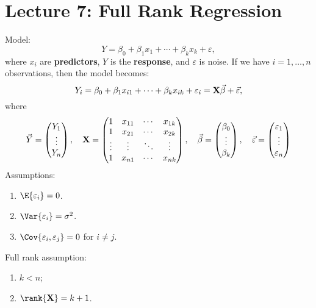\section{Lecture 7: Full Rank Regression}
Model:
\[ Y=\beta_0+\beta_1x_1+\cdots+\beta_k x_k+\varepsilon, \]
where $ x_i $ are \textbf{predictors}, $ Y $ is the \textbf{response},
and $ \varepsilon $ is noise. If we have $ i=1,\ldots,n $ observations, then the model becomes:
\[ Y_i=\beta_0+\beta_1x_{i1}+\cdots+\beta_k x_{ik}+\varepsilon_i=\mathbf{X}\vec{\beta}+\vec{\varepsilon}, \]
where
\[ \vec{Y}=\begin{pmatrix}
        Y_1    \\
        \vdots \\
        Y_n
    \end{pmatrix},\quad
    \mathbf{X}=\begin{pmatrix}
        1      & x_{11} & \cdots & x_{1k} \\
        1      & x_{21} & \cdots & x_{2k} \\
        \vdots & \vdots & \ddots & \vdots \\
        1      & x_{n1} & \cdots & x_{nk}
    \end{pmatrix},\quad
    \vec{\beta}=\begin{pmatrix}
        \beta_0 \\
        \vdots  \\
        \beta_k
    \end{pmatrix},\quad
    \vec{\varepsilon}=
    \begin{pmatrix}
        \varepsilon_1 \\
        \vdots        \\
        \varepsilon_n
    \end{pmatrix} \]
Assumptions:
\begin{enumerate}[(1)]
    \item $ \E{\varepsilon_i}=0 $.
    \item $ \Var{\varepsilon_i}=\sigma^2 $.
    \item $ \Cov{\varepsilon_i,\varepsilon_j}=0 $ for $ i\ne j $.
\end{enumerate}
Full rank assumption:
\begin{enumerate}[(1)]
    \item $ k<n $;
    \item $ \rank{\Matrix{X}}=k+1 $.
\end{enumerate}
